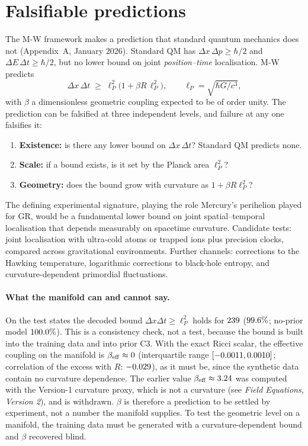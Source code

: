 \section{Falsifiable predictions}
\label{sec:falsify}
The M-W framework makes a prediction that standard quantum mechanics does not (Appendix~A,
January 2026). Standard QM has $\Delta x\,\Delta p\ge\hbar/2$ and $\Delta E\,\Delta t\ge\hbar/2$, but no
lower bound on joint \emph{position--time} localisation. M-W predicts
\begin{equation}
\Delta x\,\Delta t\;\ge\;\ell_P^{2}\bigl(1+\beta R\,\ell_P^{2}\bigr),\qquad \ell_P=\sqrt{\hbar G/c^{3}},
\label{eq:xt}
\end{equation}
with $\beta$ a dimensionless geometric coupling expected to be of order unity. The prediction can
be falsified at three independent levels, and failure at any one falsifies it:
\begin{enumerate}\itemsep0pt
\item \textbf{Existence:} is there any lower bound on $\Delta x\,\Delta t$? Standard QM predicts none.
\item \textbf{Scale:} if a bound exists, is it set by the Planck area $\ell_P^{2}$?
\item \textbf{Geometry:} does the bound grow with curvature as $1+\beta R\ell_P^{2}$?
\end{enumerate}
The defining experimental signature, playing the role Mercury's perihelion played for GR, would be
a fundamental lower bound on joint spatial--temporal localisation that depends measurably on
spacetime curvature. Candidate tests: joint localisation with ultra-cold atoms or trapped ions plus
precision clocks, compared across gravitational environments. Further channels: corrections to
the Hawking temperature, logarithmic corrections to black-hole entropy, and curvature-dependent
primordial fluctuations.

\paragraph{What the manifold can and cannot say.} On the \UStatesA{} test states the decoded bound
$\Delta x\Delta t\ge\ell_P^{2}$ holds for $239$ ($99.6\%$; no-prior model $100.0\%$). This is a
consistency check, not a test, because the bound is built into the training data and into prior C3.
With the exact Ricci scalar, the effective coupling on the manifold is $\beta_{\rm eff}\approx0$
(interquartile range $[-0.0011,0.0010]$; correlation of the excess with $R$: $-0.029$), as it must
be, since the synthetic data contain no curvature dependence. The earlier value
$\beta_{\rm eff}\approx3.24$ was computed with the Version-1 curvature proxy, which is not a curvature
(see \emph{Field Equations, Version 2}), and is withdrawn. $\beta$ is therefore a prediction to be
settled by experiment, not a number the manifold supplies. To test the geometric level on a
manifold, the training data must be generated with a curvature-dependent bound and $\beta$ recovered
blind.

